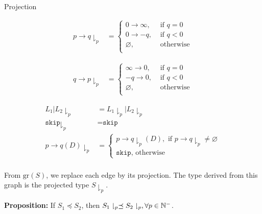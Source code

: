 \begin{frame}{Projection}
  \begin{center}
    \begin{minipage}{0.48\textwidth}
      $$\begin{array}{rlr}
          p\rightarrow q \downharpoonright_p & =

          \begin{cases}
            0\rightarrow \infty, & \text{ if } q=0   \\
            0\rightarrow -q,     & \text{ if } q < 0 \\
            \varnothing,         & \text{ otherwise} \\
          \end{cases}
        \end{array}$$
    \end{minipage}
    \hfill
    \begin{minipage}{0.48\textwidth}
      $$\begin{array}{rlr}
          q\rightarrow p \downharpoonright_p & =
          \begin{cases}
            \infty\rightarrow 0, & \text{ if } q=0   \\
            -q\rightarrow 0,     & \text{ if } q < 0 \\
            \varnothing,         & \text{ otherwise} \\
          \end{cases}
        \end{array}$$
    \end{minipage}
  \end{center}

  $$\begin{array}{rlr}
      L_1|L_2 \downharpoonright_p           & =
      L_1\downharpoonright_p | L_2 \downharpoonright_p                                                   \\
      \texttt{skip}\downharpoonright_p      & = \texttt{skip}                                            \\

      p\rightarrow q (D)\downharpoonright_p & =
      \begin{cases}
        p\rightarrow q\downharpoonright_p (D), \text{ if } p\rightarrow q\downharpoonright_p\ne\varnothing \\
        \texttt{skip}, \text{ otherwise}
      \end{cases} \\
    \end{array}$$

  From $\text{gr}(S)$, we replace each edge by its projection. The type derived from this graph is the projected type $S\downharpoonright_p$.

  \textbf{Proposition:} If $S_1\preceq S_2$, then $S_1\downharpoonright_p \preceq S_2\downharpoonright_p,\forall p \in \mathbb{N}^{-}$.
\end{frame}

